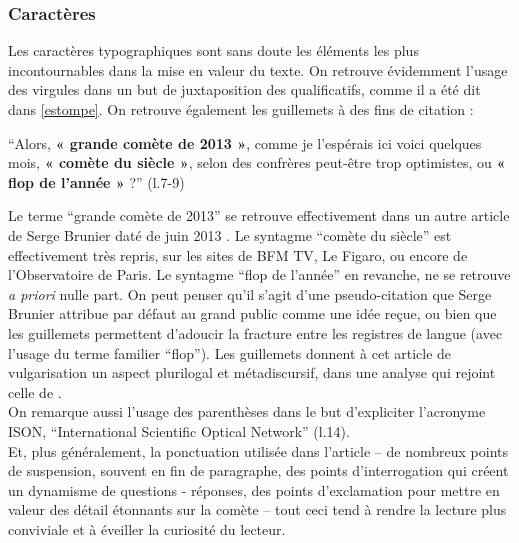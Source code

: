 \documentclass[a4paper,10pt]{article}
\begin{document}
		\subsubsection{Caractères}
			Les caractères typographiques sont sans doute les éléments les plus incontournables dans la mise en valeur du texte. On retrouve évidemment l'usage des virgules dans un but de juxtaposition des qualificatifs, comme il a été dit dans \ref{estompe}. On retrouve également les guillemets à des fins de citation :
			\begin{center}
				\footnotesize
				\begin{minipage}{0.7\textwidth}
					``Alors, \textbf{« grande comète de 2013 »}, comme je l'espérais ici voici quelques mois, \textbf{« comète du siècle »}, selon des confrères peut-être trop optimistes, ou \textbf{« flop de l'année »} ?'' (l.7-9)
				\end{minipage}
			\end{center}
			Le terme ``grande comète de 2013'' se retrouve effectivement dans un autre article de Serge Brunier daté de juin 2013 \cite{Brunier2013}. Le syntagme ``comète du siècle'' est effectivement très repris, sur les sites de BFM TV, Le Figaro, ou encore de l'Observatoire de Paris. Le syntagme ``flop de l'année'' en revanche, ne se retrouve \textit{a priori} nulle part. On peut penser qu'il s'agit d'une pseudo-citation que Serge Brunier attribue par défaut au grand public comme une idée reçue, ou bien que les guillemets permettent d'adoucir la fracture entre les registres de langue (avec l'usage du terme familier ``flop''). Les guillemets donnent à cet article de vulgarisation un aspect plurilogal et métadiscursif, dans une analyse qui rejoint celle de \cite{Toure2000}.\\
			On remarque aussi l'usage des parenthèses dans le but d'expliciter l'acronyme ISON, ``International Scientific Optical Network'' (l.14).\\
			Et, plus généralement, la ponctuation utilisée dans l'article -- de nombreux points de suspension, souvent en fin de paragraphe, des points d'interrogation qui créent un dynamisme de questions - réponses, des points d'exclamation pour mettre en valeur des détail étonnants sur la comète -- tout ceci tend à rendre la lecture plus conviviale et à éveiller la curiosité du lecteur.
\end{document}

